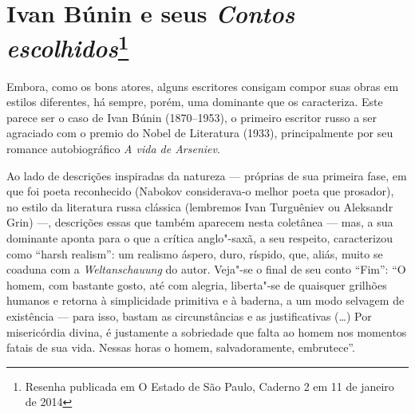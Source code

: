 \chapter{Ivan Búnin e seus \emph{Contos escolhidos}\footnote{Resenha publicada em O Estado de São Paulo, Caderno 2 em 11 de janeiro de 2014}}

Embora, como os bons atores, alguns escritores consigam compor suas obras em estilos diferentes, há sempre, porém, uma dominante que os caracteriza. Este parece ser o caso de Ivan Búnin (1870--1953), o primeiro escritor russo a ser agraciado com o premio do Nobel de Literatura (1933), principalmente por seu romance autobiográfico \emph{A vida de Arseniev}. 

Ao lado de descrições inspiradas da natureza --- próprias de sua primeira fase, em que foi poeta reconhecido (Nabokov considerava-o melhor poeta que prosador), no estilo da literatura russa clássica (lembremos Ivan Turguêniev ou  Aleksandr Grin) ---, descrições  essas  que também aparecem nesta coletânea  --- mas, a sua dominante aponta para o que a crítica anglo"-saxã, a seu respeito, caracterizou como ``harsh realism'': um realismo áspero, duro, ríspido, que, aliás, muito se coaduna com a \emph{Weltanschauung} do autor. Veja"-se o final de seu conto ``Fim'': ``O homem, com bastante gosto, até com alegria, liberta"-se de quaisquer grilhões humanos e retorna à simplicidade primitiva e à baderna, a um modo selvagem de existência --- para isso, bastam as circunstâncias e as justificativas (\ldots{}) Por misericórdia divina, é justamente a sobriedade que falta ao homem nos momentos fatais de sua vida. Nessas horas o homem, salvadoramente, embrutece''.

